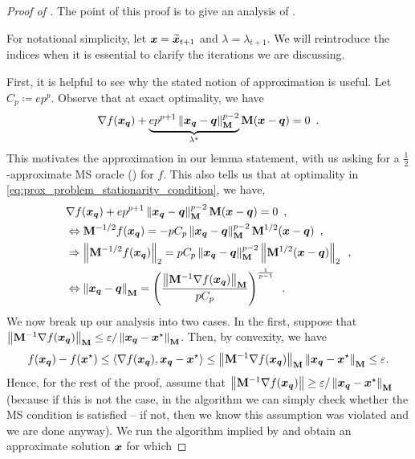 \begin{proof}[Proof of ]
The point of this proof is to give an analysis of .

For notational simplicity, let $\bm{x}=\widetilde{\bm{x}}_{t+1}$ and $\lambda = \lambda_{t+1}$. We will reintroduce the indices when it is essential to clarify the iterations we are discussing.

First, it is helpful to see why the stated notion of approximation is useful. Let $C_p \coloneqq ep^p$. Observe that at exact optimality, we have
\begin{align}
    \nabla f(\bm{x}_{\bm{q}}) + \underbrace{ep^{p+1}\left\lVert \bm{x}_{\bm{q}}-\bm{q} \right\rVert_{\mathbf{M}}^{p-2}}_{\lambda^{\star}}\mathbf{M}(\bm{x}-\bm{q})=0\enspace.\label{eq:prox_problem_stationarity_condition}
\end{align}
This motivates the approximation in our lemma statement, with us asking for a $\frac{1}{2}$-approximate MS oracle () for $f$. This also tells us that at optimality in \eqref{eq:prox_problem_stationarity_condition}, we have,
\begin{align*}
    &\nabla f(\bm{x}_{\bm{q}}) + ep^{p+1}\left\lVert \bm{x}_{\bm{q}}-\bm{q} \right\rVert_{\mathbf{M}}^{p-2}\mathbf{M}(\bm{x}-\bm{q})=0\enspace,\\
    &\Leftrightarrow \mathbf{M}^{-1/2}f(\bm{x}_{\bm{q}}) = -pC_p\left\lVert \bm{x}_{\bm{q}}-\bm{q} \right\rVert_{\mathbf{M}}^{p-2}\mathbf{M}^{1/2}(\bm{x}-\bm{q})\enspace,\\
    &\Rightarrow \left\lVert \mathbf{M}^{-1/2}f(\bm{x}_{\bm{q}}) \right\rVert_{2} = pC_p\left\lVert \bm{x}_{\bm{q}}-\bm{q} \right\rVert_{\mathbf{M}}^{p-2}\left\lVert \mathbf{M}^{1/2}(\bm{x}-\bm{q}) \right\rVert_2\enspace,\\
    &\Leftrightarrow\left\lVert \bm{x}_{\bm{q}}-\bm{q} \right\rVert_{\mathbf{M}} = \left(\frac{\left\lVert \mathbf{M}^{-1}\nabla f(\bm{x}_{\bm{q}}) \right\rVert_{\mathbf{M}}}{pC_p}\right)^{\frac{1}{p-1}}\enspace.
\end{align*}
We now break up our analysis into two cases. In the first, suppose that $\left\lVert \mathbf{M}^{-1}\nabla f(\bm{x}_{\bm{q}}) \right\rVert_{\mathbf{M}} \le \varepsilon/\left\lVert \bm{x}_{\bm{q}}-\bm{x}^{\star} \right\rVert_{\mathbf{M}}$. Then, by convexity, we have
\begin{align*}
    f(\bm{x}_{\bm{q}})-f(\bm{x}^{\star}) \le \left\langle \nabla f(\bm{x}_{\bm{q}}), \bm{x}_{\bm{q}}-\bm{x}^{\star} \right\rangle \le \left\lVert \mathbf{M}^{-1}\nabla f(\bm{x}_{\bm{q}}) \right\rVert_{\mathbf{M}}\left\lVert \bm{x}_{\bm{q}}-\bm{x}^{\star} \right\rVert_{\mathbf{M}} \le \varepsilon.   
\end{align*}
Hence, for the rest of the proof, assume that $\left\lVert \mathbf{M}^{-1}\nabla f(\bm{x}_{\bm{q}}) \right\rVert \ge \varepsilon/\left\lVert \bm{x}_{\bm{q}}-\bm{x}^{\star} \right\rVert_{\mathbf{M}}$ (because if this is not the case, in the algorithm we can simply check whether the MS condition is satisfied -- if not, then we know this assumption was violated and we are done anyway). We run the algorithm implied by  and obtain an approximate solution $\bm{x}$ for which

\end{proof}
